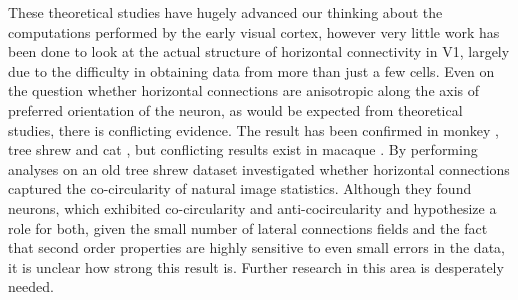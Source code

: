 These theoretical studies have hugely advanced our thinking about the
computations performed by the early visual cortex, however very little
work has been done to look at the actual structure of horizontal
connectivity in V1, largely due to the difficulty in obtaining data
from more than just a few cells. Even on the question whether
horizontal connections are anisotropic along the axis of preferred
orientation of the neuron, as would be expected from theoretical
studies, there is conflicting evidence. The result has been confirmed
in monkey \citep{Sincich2001}, tree shrew \citep{Bosking1997} and cat
\citep{Schmidt1997}, but conflicting results exist in macaque
\cite{Angelucci2002}. By performing analyses on an old tree shrew
dataset \cite{Hunt2011} investigated whether horizontal connections
captured the co-circularity of natural image statistics. Although they
found neurons, which exhibited co-circularity and anti-cocircularity
and hypothesize a role for both, given the small number of lateral
connections fields and the fact that second order properties are
highly sensitive to even small errors in the data, it is unclear how
strong this result is. Further research in this area is desperately
needed.
